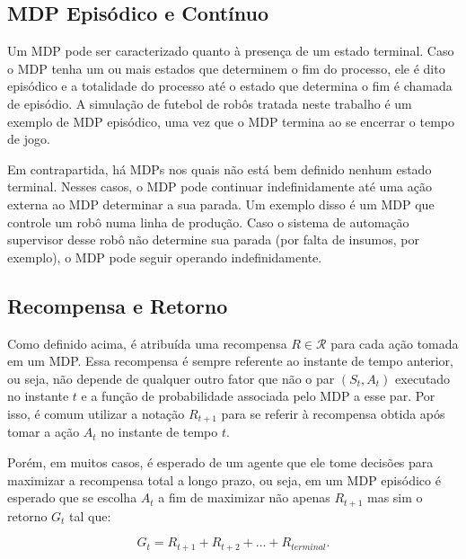 \subsection{MDP Episódico e Contínuo}

Um MDP pode ser caracterizado quanto à presença de um estado terminal. Caso o MDP tenha um ou mais estados que determinem o fim do processo, ele é dito episódico e a totalidade do processo até o estado que determina o fim é chamada de episódio. A simulação de futebol de robôs tratada neste trabalho é um exemplo de MDP episódico, uma vez que o MDP termina ao se encerrar o tempo de jogo.

Em contrapartida, há MDPs nos quais não está bem definido nenhum estado terminal. Nesses casos, o MDP pode continuar indefinidamente até uma ação externa ao MDP determinar a sua parada. Um exemplo disso é um MDP que controle um robô numa linha de produção. Caso o sistema de automação supervisor desse robô não determine sua parada (por falta de insumos, por exemplo), o MDP pode seguir operando indefinidamente.


\subsection{Recompensa e Retorno}

Como definido acima, é atribuída uma recompensa $R \in \mathcal{R}$ para cada ação tomada em um MDP. Essa recompensa é sempre referente ao instante de tempo anterior, ou seja, não depende de qualquer outro fator que não o par $(S_t, A_t)$ executado no instante $t$ e a função de probabilidade associada pelo MDP a esse par. Por isso, é comum utilizar a notação $R_{t+1}$ para se referir à recompensa obtida após tomar a ação $A_t$ no instante de tempo $t$.

Porém, em muitos casos, é esperado de um agente que ele tome decisões para maximizar a recompensa total a longo prazo, ou seja, em um MDP episódico é esperado que se escolha $A_t$ a fim de maximizar não apenas $R_{t+1}$ mas sim o retorno $G_{t}$ tal que:

\begin{equation}
G_{t} = R_{t+1} + R_{t+2} + \dotsc + R_{terminal}.
\end{equation}

